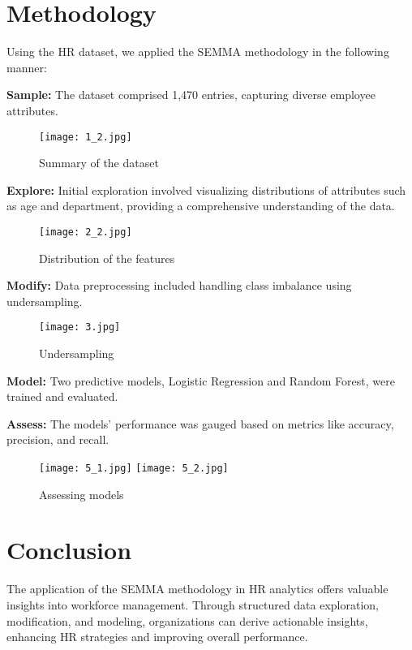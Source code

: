 \documentclass{article}
\begin{document}
\section{Methodology}
Using the HR dataset, we applied the SEMMA methodology in the following manner:

\textbf{Sample:}
The dataset comprised 1,470 entries, capturing diverse employee attributes.

\begin{figure}[H]
    \centering
    \texttt{[image: 1\_2.jpg]}
    \caption{Summary of the dataset}
\end{figure}

\textbf{Explore:} Initial exploration involved visualizing distributions of attributes such as age and department, providing a comprehensive understanding of the data.

\begin{figure}[H]
    \centering
    \texttt{[image: 2\_2.jpg]}
    \caption{Distribution of the features}
\end{figure}

\textbf{Modify:} Data preprocessing included handling class imbalance using undersampling.

\begin{figure}[H]
    \centering
    \texttt{[image: 3.jpg]}
    \caption{Undersampling}
\end{figure}

\textbf{Model:} Two predictive models, Logistic Regression and Random Forest, were trained and evaluated.

\textbf{Assess:} The models' performance was gauged based on metrics like accuracy, precision, and recall.

\begin{figure}[H]
    \centering
    \texttt{[image: 5\_1.jpg]}
    \texttt{[image: 5\_2.jpg]}
    \caption{Assessing models}
\end{figure}

\section{Conclusion}
The application of the SEMMA methodology in HR analytics offers valuable insights into workforce management. Through structured data exploration, modification, and modeling, organizations can derive actionable insights, enhancing HR strategies and improving overall performance.
\end{document}
